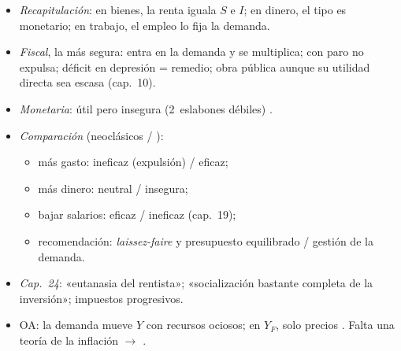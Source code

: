 \documentclass{article}
\begin{document}
\begin{columnas}
\begin{itemize}
  \begin{itemize}
  \item Nada lo garantiza: trampa; la deflación empeora expectativas y la carga real de las deudas; quita renta a quienes más consumen.
  \item Salarios nominales estables $\Rightarrow$ más estabilidad.
  \end{itemize}
\item \emph{Recapitulación}: en bienes, la renta iguala $S$ e $I$; en dinero, el tipo es monetario; en trabajo, el empleo lo fija la demanda.
\end{itemize}

\begin{itemize}
\item \emph{Fiscal}, la más segura: entra en la demanda y se multiplica; con paro no expulsa; déficit en depresión = remedio; obra pública aunque su utilidad directa sea escasa (cap.~10).
\item \emph{Monetaria}: útil pero insegura (2~eslabones débiles) .
\item \emph{Comparación} (neoclásicos / ):
  \begin{itemize}
  \item más gasto: ineficaz (expulsión) / eficaz;
  \item más dinero: neutral / insegura;
  \item bajar salarios: eficaz / ineficaz (cap.~19);
  \item recomendación: \emph{laissez-faire} y presupuesto equilibrado / gestión de la demanda.
  \end{itemize}
\item \emph{Cap.~24}: «eutanasia del rentista»; «socialización bastante completa de la inversión»; impuestos progresivos.
\item OA: la demanda mueve $Y$ con recursos ociosos; en $Y_F$, solo precios . Falta una teoría de la inflación $\to$   .
\end{itemize}


\end{columnas}
\end{document}
